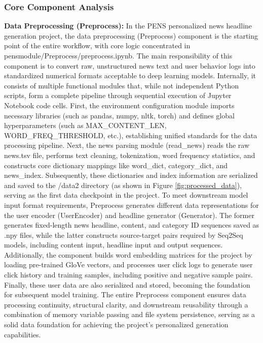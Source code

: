 \documentclass[10pt,a4paper]{article}
\begin{document}
\subsubsection{Core Component Analysis}
\textbf{Data Preprocessing (Preprocess):} In the PENS personalized news headline generation project, the data preprocessing (Preprocess) component is the starting point of the entire workflow, with core logic concentrated in pensmodule/Preprocess/preprocess.ipynb. The main responsibility of this component is to convert raw, unstructured news text and user behavior logs into standardized numerical formats acceptable to deep learning models. Internally, it consists of multiple functional modules that, while not independent Python scripts, form a complete pipeline through sequential execution of Jupyter Notebook code cells. First, the environment configuration module imports necessary libraries (such as pandas, numpy, nltk, torch) and defines global hyperparameters (such as MAX\_CONTENT\_LEN, WORD\_FREQ\_THRESHOLD, etc.), establishing unified standards for the data processing pipeline. Next, the news parsing module (read\_news) reads the raw news.tsv file, performs text cleaning, tokenization, word frequency statistics, and constructs core dictionary mappings like word\_dict, category\_dict, and news\_index. Subsequently, these dictionaries and index information are serialized and saved to the /data2 directory (as shown in Figure \ref{fig:processed_data}), serving as the first data checkpoint in the project. To meet downstream model input format requirements, Preprocess generates different data representations for the user encoder (UserEncoder) and headline generator (Generator). The former generates fixed-length news headline, content, and category ID sequences saved as .npy files, while the latter constructs source-target pairs required by Seq2Seq models, including content input, headline input and output sequences. Additionally, the component builds word embedding matrices for the project by loading pre-trained GloVe vectors, and processes user click logs to generate user click history and training samples, including positive and negative sample pairs. Finally, these user data are also serialized and stored, becoming the foundation for subsequent model training. The entire Preprocess component ensures data processing continuity, structural clarity, and downstream reusability through a combination of memory variable passing and file system persistence, serving as a solid data foundation for achieving the project's personalized generation capabilities.
\end{document}
